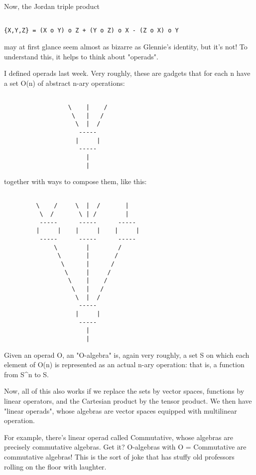 Now, the Jordan triple product


\begin{verbatim}

{X,Y,Z} = (X o Y) o Z + (Y o Z) o X - (Z o X) o Y
\end{verbatim}
    
may at first glance seem almost as bizarre as Glennie's identity,
but it's not!  To understand this, it helps to think about "operads".

I defined operads last week.  Very roughly, these are gadgets 
that for each n have a set O(n) of abstract n-ary operations:



\begin{verbatim}

                  \    |    /
                   \   |   / 
                    \  |  /
                     -----
                    |     | 
                     -----
                       |
                       |
\end{verbatim}
    
together with ways to compose them, like this:



\begin{verbatim}

         \    /     \  |  /       | 
          \  /       \ | /        |
          -----      -----      -----
         |     |    |     |    |     |
          -----      -----      -----
              \        |        /  
               \       |       /
                \      |      /
                 \     |     /
                  \    |    / 
                   \   |   /  
                    \  |  /
                     -----
                    |     | 
                     -----
                       |
                       |
\end{verbatim}
    
Given an operad O, an "O-algebra" is, again very roughly, a set S on
which each element of O(n) is represented as an actual n-ary operation:
that is, a function from S^{n} to S.

Now, all of this also works if we replace the sets by vector spaces,
functions by linear operators, and the Cartesian product by the tensor
product.  We then have "linear operads", whose algebras are vector
spaces equipped with multilinear operation.

For example, there's linear operad called Commutative, whose algebras
are precisely commutative algebras.  Get it?  O-algebras with O = 
Commutative are commutative algebras!  This is the sort of joke that 
has stuffy old professors rolling on the floor with laughter.

